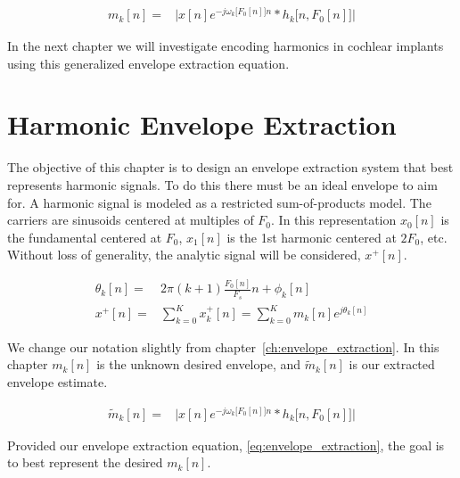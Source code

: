 \documentclass [11pt, proquest,oneside] {ganter_thesis}[2015/03/03]
\begin{document}
\begin{align}
\label{eq:envelope_extraction_general}
m_k[n] =& \Big| x[n]e^{-j \omega_k\big[F_0[n]\big]n} * h_k\big[n,F_0[n]\big]  \Big|
\end{align}

In the next chapter we will investigate encoding harmonics in cochlear implants using this generalized envelope extraction equation.





\chapter{Harmonic Envelope Extraction}\label{ch:harmonic_envelopes}

The objective of this chapter is to design an envelope extraction system that best represents harmonic signals.  To do this there must be an ideal envelope to aim for.  A harmonic signal is modeled as  a restricted sum-of-products model.  The carriers are sinusoids centered at multiples of $F_0$. In this representation $x_0[n]$ is the fundamental centered at $F_0$, $x_1[n]$ is the 1st harmonic centered at $2F_0$, etc.  Without loss of generality, the analytic signal will be considered, $x^+[n]$.

\begin{align}
\theta_k[n] =& 2\pi(k+1)\frac{F_0[n]}{F_s}n + \phi_k[n] \\
\label{eq:harmonic_SOP}
x^+[n] =& \sum\limits_{k=0}^K x_k^+[n] = \sum\limits_{k=0}^K m_k[n] e^{j\theta_k[n]}
\end{align}

We change our notation slightly from chapter~\ref{ch:envelope_extraction}.  In this chapter $m_k[n]$ is the unknown desired envelope, and $\tilde{m}_k[n]$ is our extracted envelope estimate.

\begin{align}
\label{eq:envelope_extraction}
\tilde{m}_k[n] =& \Big| x[n]e^{-j \omega_k\big[F_0[n]\big]n} * h_k\big[n,F_0[n]\big]  \Big|
\end{align}

Provided our envelope extraction equation, \ref{eq:envelope_extraction}, the goal is to best represent the desired $m_k[n]$.
\end{document}
